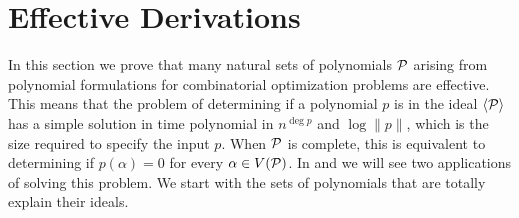 \chapter{Effective Derivations}\label{cha:effective_derivations}
In this section we prove that many natural sets of polynomials $\mathcal P$ arising from polynomial formulations for combinatorial optimization problems are effective. This means that the problem of determining if a polynomial $p$ is in the ideal $\langle \mathcal P \rangle$ has a simple solution in time polynomial in $n^{\deg p}$ and $\log \|p\|$, which is the size required to specify the input $p$. When $\mathcal P$ is complete, this is equivalent to determining if $p(\alpha) = 0$ for every $\alpha \in V(\mathcal P)$. In  and  we will see two applications of solving this problem. We start with the sets of polynomials that are totally explain their ideals.

